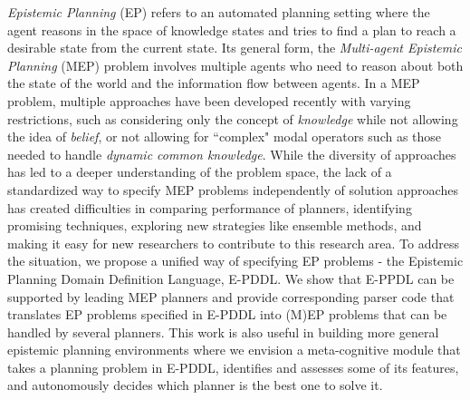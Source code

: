 
\emph{Epistemic Planning} (EP) refers to an automated planning setting where the agent reasons in the space of knowledge states and tries to find a plan to reach a desirable state from the current state. Its general form, the \emph{Multi-agent Epistemic Planning} (MEP) problem involves multiple agents who need to reason about both the state of the world and the information flow between agents.
In a MEP problem, multiple approaches have been developed recently with varying restrictions, such as considering only the concept of \emph{knowledge} while not allowing the idea of \emph{belief}, or not allowing for ``complex" modal operators such as those needed to handle \emph{dynamic common knowledge}. 
While the diversity of approaches has led to a deeper understanding of the problem space, the lack of a  standardized way to specify MEP problems independently of solution approaches has created difficulties in comparing performance of planners, identifying promising techniques, exploring new strategies like ensemble methods, and making it easy for new researchers to contribute to this research area.
To address the situation, we propose a unified way of specifying EP problems - the Epistemic Planning Domain Definition Language, E-PDDL. We show that E-PPDL can be supported by leading MEP planners and provide corresponding parser code that translates EP problems specified in E-PDDL into (M)EP problems that can be handled by several planners. 
This work is also useful in building more general epistemic planning environments where we envision a meta-cognitive module that takes a planning problem in E-PDDL, identifies and assesses some of its features, and autonomously decides which planner is the best one to solve it.